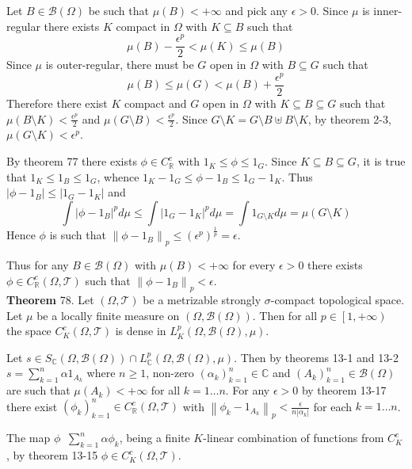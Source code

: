 \documentclass[a4paper]{article}
\newcommand{\clop}[1]{\left [ #1 \right )}
\newcommand{\brac}[1]{\left ( #1 \right )}
\newcommand{\abs}[1]{\left | #1 \right |}
\newcommand{\nrm}[1]{\left\| #1 \right \|}
\newcommand{\Real}{\mathbb{R}}
\newcommand{\Cplx}{\mathbb{C}}
\newcommand{\Tcal}{\mathcal{T}}
\newcommand{\borel}[1]{\mathcal{B}\brac{#1}}
\newcommand{\defn}{\mathop{\overset{\Delta}{=}}\nolimits}
\begin{document}
Let $B\in \borel{\Omega}$ be such that $\mu\brac{B}<+\infty$ and pick any $\epsilon>0$. Since $\mu$ is inner-regular there exists $K$ compact in $\Omega$ with $K\subseteq B$ such that \[\mu\brac{B}-\frac{\epsilon^p}{2}< \mu\brac{K}\leq \mu\brac{B}\] Since $\mu$ is outer-regular, there must be $G$ open in $\Omega$ with $B\subseteq G$ such that \[\mu\brac{B}\leq \mu\brac{G}<\mu\brac{B}+\frac{\epsilon^p}{2}\] Therefore there exist $K$ compact and $G$ open in $\Omega$ with $K\subseteq B\subseteq G$ such that $\mu\brac{B\setminus K}<\frac{\epsilon^p}{2}$ and $\mu\brac{G\setminus B}<\frac{\epsilon^p}{2}$. Since $G\setminus K = G\setminus B \uplus B\setminus K$, by theorem 2-3, $\mu\brac{G\setminus K}<\epsilon^p$.

By theorem 77 there exists $\phi\in C^c_\Real$ with $1_K\leq\phi\leq1_G$. Since $K\subseteq B\subseteq G$, it is true that $1_K\leq1_B\leq1_G$, whence $1_K-1_G\leq \phi-1_B\leq 1_G-1_K$. Thus $\abs{\phi-1_B}\leq \abs{1_G-1_K}$ and \[\int\abs{\phi-1_B}^p d\mu \leq \int \abs{1_G-1_K}^p d\mu =  \int 1_{G\setminus K} d\mu = \mu\brac{G\setminus K}\] Hence $\phi$ is such that $\nrm{\phi-1_B}_p\leq \brac{\epsilon^p}^\frac{1}{p} = \epsilon$.

Thus for any $B\in \borel{\Omega}$ with $\mu\brac{B}<+\infty$ for every $\epsilon>0$ there exists $\phi\in C^c_\Real\brac{\Omega,\Tcal}$ such that $\nrm{\phi-1_B}_p<\epsilon$.\\

\label{thm:compact_support_lp_dense} \noindent\textbf{Theorem} 78.
Let $\brac{\Omega,\Tcal}$ be a metrizable strongly $\sigma$-compact topological space. Let $\mu$ be a locally finite measure on $\brac{\Omega,\borel{\Omega}}$. Then for all $p\in \clop{1,+\infty}$ the space $C^c_K\brac{\Omega,\Tcal}$ is dense in $L^p_K\brac{\Omega,\borel{\Omega},\mu}$.

Let $s\in S_\Cplx\brac{\Omega,\borel{\Omega}}\cap L^p_\Cplx\brac{\Omega,\borel{\Omega},\mu}$. Then by theorems 13-1 and 13-2 $s=\sum_{k=1}^n \alpha 1_{A_k}$ where $n\geq1$, non-zero $\brac{\alpha_k}_{k=1}^n\in \Cplx$ and $\brac{A_k}_{k=1}^n\in \borel{\Omega}$ are such that $\mu\brac{A_k}<+\infty$ for all $k=1\ldots n$. For any $\epsilon>0$ by theorem 13-17 there exist $\brac{\phi_k}_{k=1}^n\in C^c_\Real\brac{\Omega,\Tcal}$ with $\nrm{\phi_k-1_{A_k}}_p<\frac{\epsilon}{n\abs{\alpha_k}}$ for each $k=1\ldots n$.

The map $\phi\defn \sum_{k=1}^n \alpha \phi_k$, being a finite $K$-linear combination of functions from $C^c_K$, by theorem 13-15 $\phi\in C^c_K\brac{\Omega,\Tcal}$.
\end{document}
